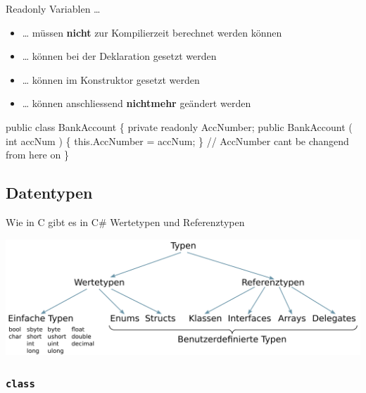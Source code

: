 \documentclass[
  9pt,
  a4paperpaper,
  DIV=11]{scrartcl}
\newenvironment{Shaded}{}{}
\newcommand{\CommentTok}[1]{\textcolor[rgb]{0.42,0.45,0.49}{#1}}
\newcommand{\DataTypeTok}[1]{\textcolor[rgb]{0.84,0.23,0.29}{#1}}
\newcommand{\FunctionTok}[1]{\textcolor[rgb]{0.44,0.26,0.76}{#1}}
\newcommand{\KeywordTok}[1]{\textcolor[rgb]{0.84,0.23,0.29}{#1}}
\newcommand{\NormalTok}[1]{\textcolor[rgb]{0.14,0.16,0.18}{#1}}
\newcommand{\OperatorTok}[1]{\textcolor[rgb]{0.14,0.16,0.18}{#1}}
\providecommand{\tightlist}{%
  \setlength{\itemsep}{0pt}\setlength{\parskip}{0pt}}\usepackage{longtable,booktabs,array}
\numberwithin{equation}{section}
\begin{document}
\begin{multicols}{2}
\begin{tcolorbox}
\begin{tcolorbox}
\begin{tcolorbox}
Readonly Variablen \ldots{}

\begin{itemize}
\tightlist
\item
  \ldots{} müssen \textbf{nicht} zur Kompilierzeit berechnet werden
  können
\item
  \ldots{} können bei der Deklaration gesetzt werden
\item
  \ldots{} können im Konstruktor gesetzt werden
\item
  \ldots{} können anschliessend \textbf{nichtmehr} geändert werden
\end{itemize}

\begin{Shaded}
\begin{Highlighting}[]
\KeywordTok{public} \KeywordTok{class}\NormalTok{ BankAccount }\OperatorTok{\{}
  \KeywordTok{private} \KeywordTok{readonly}\NormalTok{ AccNumber}\OperatorTok{;}
  \KeywordTok{public} \FunctionTok{BankAccount} \OperatorTok{(} \DataTypeTok{int}\NormalTok{ accNum }\OperatorTok{)} \OperatorTok{\{}
    \KeywordTok{this}\OperatorTok{.}\FunctionTok{AccNumber} \OperatorTok{=}\NormalTok{ accNum}\OperatorTok{;} 
  \OperatorTok{\}}
  \CommentTok{// AccNumber can\textquotesingle{}t be changend from here on}
\OperatorTok{\}}
\end{Highlighting}
\end{Shaded}

\hypertarget{datentypen}{%
\subsection{Datentypen}\label{datentypen}}

Wie in C gibt es in C\# Wertetypen und Referenztypen

\includegraphics{images/Types.png}

\hypertarget{class}{%
\subsubsection{\texorpdfstring{\texttt{class}}{class}}\label{class}}


\end{tcolorbox}
\end{tcolorbox}
\end{tcolorbox}
\end{multicols}
\end{document}
